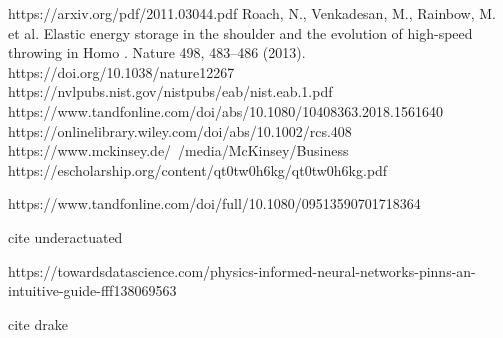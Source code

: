 \documentclass{article}
\begin{document}
\begin{thebibliography}{unsrt}
        https://arxiv.org/pdf/2011.03044.pdf
        Roach, N., Venkadesan, M., Rainbow, M. et al. Elastic energy storage in the shoulder and the evolution of high-speed throwing in Homo . Nature 498, 483–486 (2013). https://doi.org/10.1038/nature12267
        https://nvlpubs.nist.gov/nistpubs/eab/nist.eab.1.pdf
        https://www.tandfonline.com/doi/abs/10.1080/10408363.2018.1561640
        https://onlinelibrary.wiley.com/doi/abs/10.1002/rcs.408
        https://www.mckinsey.de/~/media/McKinsey/Business%
        https://escholarship.org/content/qt0tw0h6kg/qt0tw0h6kg.pdf

        https://www.tandfonline.com/doi/full/10.1080/09513590701718364

        cite underactuated

        https://towardsdatascience.com/physics-informed-neural-networks-pinns-an-intuitive-guide-fff138069563

        cite drake
\end{thebibliography}
\end{document}
